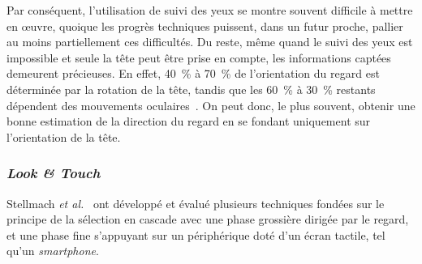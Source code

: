 	Par conséquent, l'utilisation de suivi des yeux se montre souvent difficile à mettre en œuvre, quoique les progrès techniques puissent, dans un futur proche, pallier au moins partiellement ces difficultés. Du reste, même quand le suivi des yeux est impossible et seule la tête peut être prise en compte, les informations captées demeurent précieuses. En effet, 40~\%{} à 70~\%{} de l'orientation du regard est déterminée par la rotation de la tête, tandis que les 60~\%{} à 30~\%{} restants dépendent des mouvements oculaires~\cite{gauthier1991short}. On peut donc, le plus souvent, obtenir une bonne estimation de la direction du regard en se fondant uniquement sur l'orientation de la tête.
	
	\subsubsection{\emph{Look \&{} Touch}}
	Stellmach \emph{et al.}~\cite{stellmach2012look} ont développé et évalué plusieurs techniques fondées sur le principe de la sélection en cascade avec une phase grossière dirigée par le regard, et une phase fine s'appuyant sur un périphérique doté d'un écran tactile, tel qu'un \emph{smartphone}.
	
